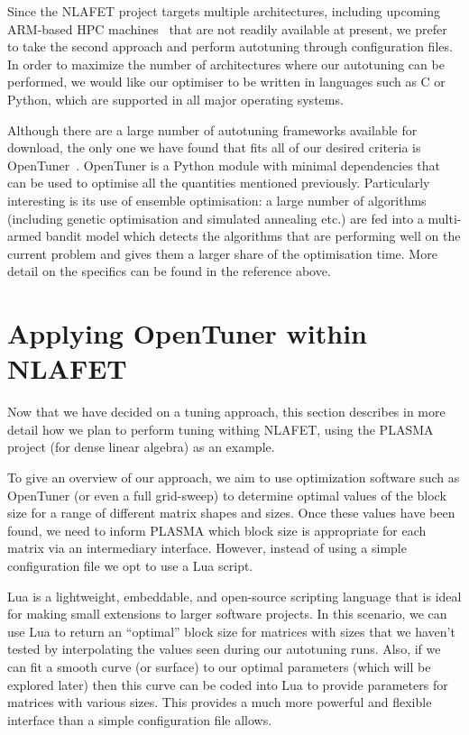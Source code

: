 \documentclass[a4paper,12pt]{article}
\begin{document}
Since the NLAFET project targets multiple architectures, including
upcoming ARM-based HPC machines~\cite{seal2001arm} that are not
readily available at present, we prefer to take the second approach
and perform autotuning through configuration files.  In order to
maximize the number of architectures where our autotuning can be
performed, we would like our optimiser to be written in languages such
as C or Python, which are supported in all major operating systems.

Although there are a large number of autotuning frameworks
available for download,
the only one we have found that fits all of our desired
criteria is OpenTuner~\cite{ansel:pact:2014}.
OpenTuner is a Python module with minimal dependencies that
can be used to optimise all the quantities mentioned previously.
Particularly interesting is its use of ensemble optimisation:
a large number of algorithms
(including genetic optimisation and simulated annealing etc.)
are fed into a multi-armed bandit model
which detects the algorithms that are performing well on the current
problem and gives them a larger share of the optimisation time.
More detail on the specifics can be found in the reference above.

\section{Applying OpenTuner within NLAFET}
\label{sec:opentuner}
Now that we have decided on a tuning approach,
this section describes in more detail how we plan to
perform tuning withing NLAFET,
using the PLASMA project (for dense linear algebra)
as an example.

To give an overview of our approach,
we aim to use optimization software such as OpenTuner
(or even a full grid-sweep)
to determine optimal values of the block size for
a range of different matrix shapes and sizes.
Once these values have been found,
we need to inform PLASMA which block size is appropriate for
each matrix via an intermediary interface.
However,
instead of using a simple configuration file
we opt to use a Lua script.

Lua is a lightweight, embeddable, and open-source scripting language
that is ideal for making small extensions to larger software projects.
In this scenario,
we can use Lua to return an ``optimal'' block size for matrices with
sizes that we haven't tested by interpolating the values seen
during our autotuning runs.
Also,
if we can fit a smooth curve (or surface) to our optimal parameters
(which will be explored later)
then this curve can be coded into Lua to
provide parameters for matrices with various sizes.
This provides a much more powerful and flexible interface
than a simple configuration file allows.
\end{document}
